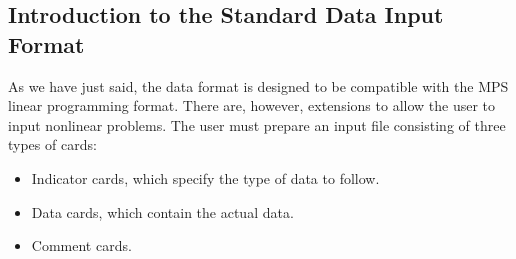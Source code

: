 \documentclass[a4paper]{article}
\begin{document}
\subsection{\label{S2.1}Introduction to the Standard Data Input Format}

As we have just said,  the data  format  is designed to be  compatible
with the MPS
linear programming
format. There  are, however, extensions   to allow the  user to  input
nonlinear problems.  The user must prepare an input file consisting of
three types of cards:
\begin{itemize}
\item Indicator cards, which specify the type of data to follow.
\item Data cards, which contain the actual data.
\item Comment cards.
\end{itemize}
\end{document}
